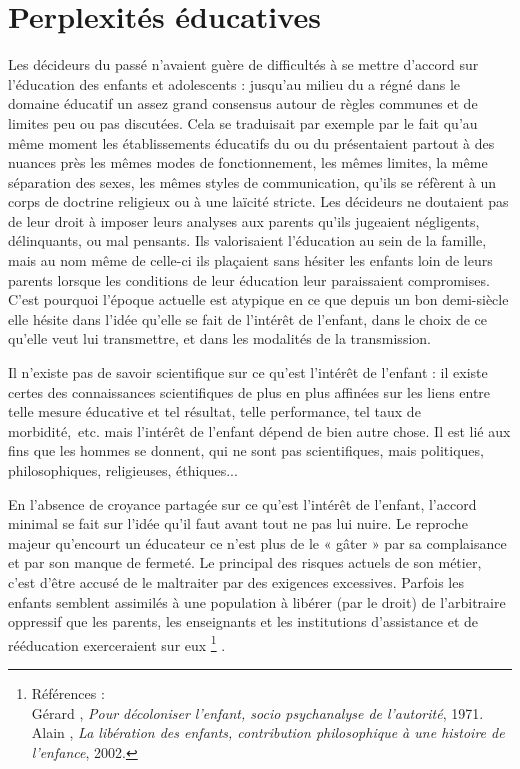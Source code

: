 
\chapter{Perplexités éducatives}


 Les décideurs du passé n'avaient guère de difficultés à se mettre d'accord sur l'éducation des enfants et adolescents : jusqu'au milieu du  a régné dans le domaine éducatif un assez grand consensus autour de règles communes et de limites peu ou pas discutées. Cela se traduisait par exemple par le fait qu'au même moment les établissements éducatifs du  ou du  présentaient partout à des nuances près les mêmes modes de fonctionnement, les mêmes limites, la même séparation des sexes, les mêmes styles de communication, qu'ils se réfèrent à un corps de doctrine religieux ou à une laïcité stricte. Les décideurs ne doutaient pas de leur droit à imposer leurs analyses aux parents qu'ils jugeaient négligents, délinquants, ou mal pensants. Ils valorisaient l'éducation au sein de la famille, mais au nom même de celle-ci ils plaçaient sans hésiter les enfants loin de leurs parents lorsque les conditions de leur éducation leur paraissaient compromises. C'est pourquoi l'époque actuelle est atypique en ce que depuis un bon demi-siècle elle hésite dans l'idée qu'elle se fait de l'intérêt de l'enfant, dans le choix de ce qu'elle veut lui transmettre, et dans les modalités de la transmission. 

 Il n'existe pas de savoir scientifique sur ce qu'est l'intérêt de l'enfant : il existe certes des connaissances scientifiques de plus en plus affinées sur les liens entre telle mesure éducative et tel résultat, telle performance, tel taux de morbidité,~etc. mais l'intérêt de l'enfant dépend de bien autre chose. Il est lié aux fins que les hommes se donnent, qui ne sont pas scientifiques, mais politiques, philosophiques, religieuses, éthiques... 

 En l'absence de croyance partagée sur ce qu'est l'intérêt de l'enfant, l'accord minimal se fait sur l'idée qu'il faut avant tout ne pas lui nuire. Le reproche majeur qu'encourt un éducateur ce n'est plus de le « gâter » par sa complaisance et par son manque de fermeté. Le principal des risques actuels de son métier, c'est d'être accusé de le maltraiter par des exigences excessives. Parfois les enfants semblent assimilés à une population à libérer (par le droit) de l'arbitraire oppressif que les parents, les enseignants et les institutions d'assistance et de rééducation exerceraient sur eux%
\footnote{Références : 
\\Gérard , \emph{Pour décoloniser l'enfant, socio psychanalyse de l'autorité}, 1971.
\\Alain {}, \emph{La libération des enfants, contribution philosophique à une histoire de l'enfance}, 2002.}%
.

